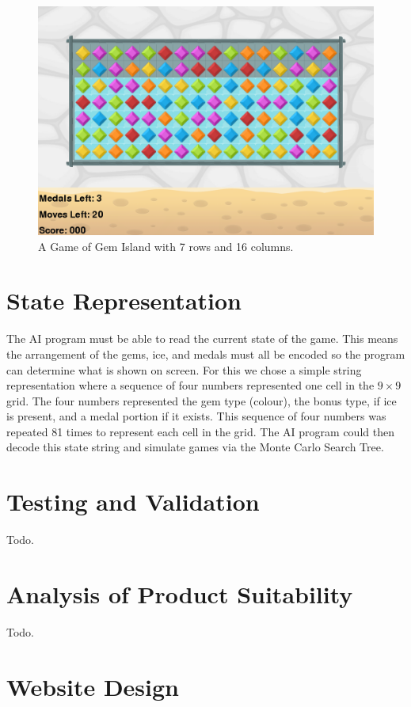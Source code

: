 \documentclass{bhamthesis}
\theoremstyle{definition}
\begin{document}
\begin{figure}
	\centering
	\includegraphics[width=\textwidth]{media/img/gemIslandRect}
	\caption{A Game of Gem Island with 7 rows and 16 columns.}\label{f:gemRect}
\end{figure}

\section{State Representation}\label{s:state}
The AI program must be able to read the current state of the game. This means the arrangement of the gems, ice, and medals must all be encoded so the program can determine what is shown on screen. For this we chose a simple string representation where a sequence of four numbers represented one cell in the $9 \times 9$ grid. The four numbers represented the gem type (colour), the bonus type, if ice is present, and a medal portion if it exists. This sequence of four numbers was repeated 81 times to represent each cell in the grid. The AI program could then decode this state string and simulate games via the Monte Carlo Search Tree.

\section{Testing and Validation}
Todo.

\section{Analysis of Product Suitability}
Todo.

\section{Website Design}\label{s:website}
\end{document}

